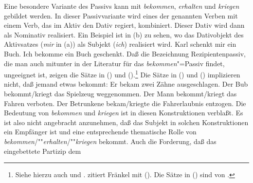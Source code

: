 %

Eine besondere Variante des Passivs kann mit \emph{bekommen},
\emph{erhalten} und \emph{kriegen}
gebildet werden. In dieser Passivvariante wird eines der genannten Verben
mit einem Verb, das im Aktiv den Dativ regiert, kombiniert. Dieser Dativ wird dann
als Nominativ realisiert. Ein Beispiel ist in (b) zu sehen, wo
das Dativobjekt des Aktivsatzes (\emph{mir} in (a)) als Subjekt (\emph{ich})
realisiert wird.
\eal
\ex{}
Karl schenkt mir      ein Buch.
\ex\label{ex-ich-bekommen-ein-buch-geschenkt} 
Ich     bekomme ein Buch       geschenkt.
\zl
Daß die Bezeichnung Rezipientenpassiv, die man auch mitunter in der 
Literatur für das \emph{bekommen}"=Passiv findet,
ungeeignet ist, zeigen die Sätze in () und ().\footnote{
        Siehe hierzu auch  
        und . 
        \citet*[]{Eroms78} zitiert Fränkel %
        mit (). %
        Die Sätze in () sind von \citet*[]{Reis76a}.
}
Die Sätze in () und () implizieren nicht, daß jemand etwas bekommt:
\ea{}
\label{bsp-zaehne-ausgeschlagen}
Er bekam zwei Zähne ausgeschlagen.
\z
\eal
\label{bsp-bekommen-passiv-mit-akk}
\ex
Der Bub bekommt/kriegt das Spielzeug weggenommen.
\ex{}
Der Mann bekommt/kriegt das Fahren  verboten.
\ex{}
Der Betrunkene bekam/kriegte die Fahrerlaubnis     entzogen.
\zl
Die Bedeutung von \emph{bekommen} und \emph{kriegen} ist in diesen
Konstruktionen verblaßt. Es ist also nicht angebracht anzunehmen,
daß das Subjekt in solchen Konstruktionen ein Empfänger ist und
eine entsprechende thematische Rolle von \emph{bekommen}/""\emph{erhalten}/""\emph{kriegen}
bekommt. Auch die Forderung, daß das eingebettete Partizip dem
